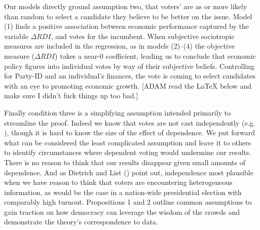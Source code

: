 \documentclass[11pt]{article}
\begin{document}
Our models directly ground assumption two, that voters' are as or more likely than random to select a candidate they believe to be better on the issue. %
Model (1) finds a positive association between economic performance captured by the variable $\Delta RDI$, and votes for the incumbent. When subjective sociotropic measures are included in the regression, as in models (2)--(4) the objective measure ($\Delta RDI$) takes a near-0 coefficient, leading us to conclude that economic policy figures into individual votes by way of their subjective beliefs. Controlling for Party-ID and an individual's finances, the vote is coming to select candidates with an eye to promoting economic growth. [ADAM read the LaTeX below and make sure I didn't fuck things up too bad.]



Finally condition three is a simplifying assumption intended primarily to streamline the proof. Indeed we know that votes are not cast independently (e.g. \citet{sinclair2012social}), though it is hard to know the size of the effect of dependence. We put forward what can be considered the least complicated assumption and leave it to others to identify circumstances where dependent voting would undermine our results. There is no reason to think that our results disappear given small amounts of dependence. And as Dietrich and List (\citeyear{Dietrich2004}) point out, independence most plausible when we have reason to think that voters are encountering heterogeneous information, as would be the case in a nation-wide presidential election with comparably high turnout. Propositions 1 and 2 outline common assumptions to gain traction on how democracy can leverage the wisdom of the crowds and demonstrate the theory's correspondence to data.
\end{document}

